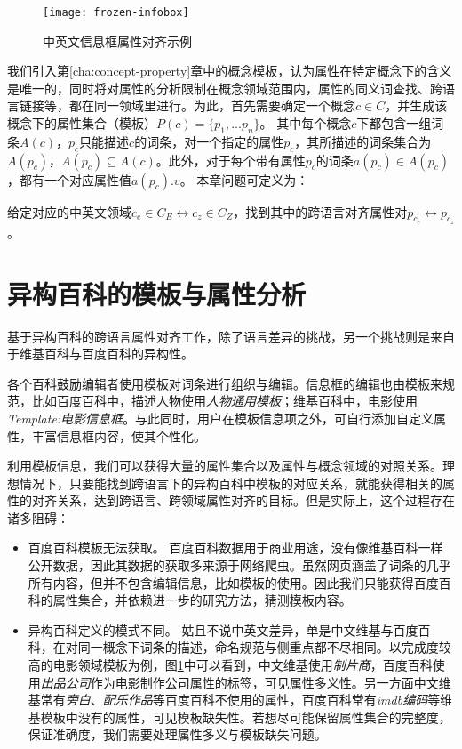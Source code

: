 \begin{figure}[H]
  \centering
  \texttt{[image: frozen-infobox]}
  \caption{中英文信息框属性对齐示例}
  \label{fig:frozen-infobox}
\end{figure}

我们引入第\ref{cha:concept-property}章中的{\heiti 概念模板}，认为属性在特定概念下的含义是唯一的，同时将对属性的分析限制在概念领域范围内，属性的同义词查找、跨语言链接等，都在同一领域里进行。为此，首先需要确定一个概念$c \in C$，并生成该概念下的属性集合（模板）$P(c)=\{p_1,...p_n\}$。
其中每个概念$c$下都包含一组词条$A(c)$，$p_c$只能描述$c$的词条，对一个指定的属性$p_c$，其所描述的词条集合为$A(p_c)$，$A(p_c) \subseteq A(c)$。此外，对于每个带有属性$p_c$的词条$a(p_c) \in A(p_c)$，都有一个对应属性值$a(p_c).v$。
本章问题可定义为：

给定对应的中英文领域$c_e \in C_E \leftrightarrow c_z \in C_Z$，找到其中的跨语言对齐属性对$p_{c_e} \leftrightarrow p_{c_z}$。

\section{异构百科的模板与属性分析}
\label{sec:template-property-analysis}

基于异构百科的跨语言属性对齐工作，除了语言差异的挑战，另一个挑战则是来自于维基百科与百度百科的异构性。

各个百科鼓励编辑者使用模板对词条进行组织与编辑。信息框的编辑也由模板来规范，比如百度百科中，描述人物使用\textit{人物通用模板}；维基百科中，电影使用\textit{Template:电影信息框}。与此同时，用户在模板信息项之外，可自行添加自定义属性，丰富信息框内容，使其个性化。

利用模板信息，我们可以获得大量的属性集合以及属性与概念领域的对照关系。理想情况下，只要能找到跨语言下的异构百科中模板的对应关系，就能获得相关的属性的对齐关系，达到跨语言、跨领域属性对齐的目标。但是实际上，这个过程存在诸多阻碍：
\begin{itemize}
\item {\heiti 百度百科模板无法获取。} 百度百科数据用于商业用途，没有像维基百科一样公开数据，因此其数据的获取多来源于网络爬虫。虽然网页涵盖了词条的几乎所有内容，但并不包含编辑信息，比如模板的使用。因此我们只能获得百度百科的属性集合，并依赖进一步的研究方法，猜测模板内容。
\item {\heiti 异构百科定义的模式不同。} 姑且不说中英文差异，单是中文维基与百度百科，在对同一概念下词条的描述，命名规范与侧重点都不尽相同。以完成度较高的电影领域模板为例，图\ref{fig:frozen-infobox}中可以看到，中文维基使用\textit{制片商}，百度百科使用\textit{出品公司}作为电影制作公司属性的标签，可见{\heiti 属性多义性}。另一方面中文维基常有\textit{旁白}、\textit{配乐作品}等百度百科不使用的属性，百度百科常有\textit{imdb编码}等维基模板中没有的属性，可见{\heiti 模板缺失性}。若想尽可能保留属性集合的完整度，保证准确度，我们需要处理属性多义与模板缺失问题。
\end{itemize}

